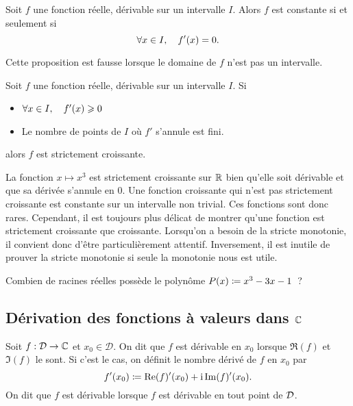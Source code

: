 \documentclass{magnoliaold}
\begin{document}
\begin{proposition}[utile=3]
Soit $f$ une fonction réelle, dérivable sur un intervalle $I$. Alors $f$ est
constante si et seulement si
\[\forall x\in I ,\quad f'(x)=0.\]
\end{proposition}

\begin{remarqueUnique}
\remarque Cette proposition est fausse lorsque le domaine de 
  $f$ n'est pas un intervalle. 
\end{remarqueUnique}

\begin{proposition}[utile=2]
Soit $f$ une fonction réelle, dérivable sur un intervalle $I$. Si
\begin{itemize}
\item $\forall x\in I ,\quad f'(x)\geqslant 0$
\item Le nombre de points de $I$ où $f'$ s'annule est fini.
\end{itemize}
alors $f$ est strictement croissante.
\end{proposition}

\begin{remarques}
\remarque La fonction $x\mapsto x^3$ est strictement croissante sur $\mathbb{R}$ bien
  qu'elle soit dérivable et que sa dérivée s'annule en 0.
\remarque Une fonction croissante qui n'est pas strictement croissante est constante sur un intervalle non trivial. Ces fonctions sont donc rares. Cependant, il est toujours plus délicat de montrer qu'une fonction est strictement croissante que croissante. Lorsqu'on a besoin de la stricte monotonie, il convient donc d'être particulièrement attentif. Inversement, il est inutile de prouver la stricte monotonie si seule la monotonie nous est utile.
\end{remarques}

\begin{exoUnique}
\exo Combien de racines réelles possède le polynôme $P(x)\coloneqq x^3-3x-1$~?
\end{exoUnique}


\subsection{Dérivation des fonctions à valeurs dans $\mathbb{C}$}

\begin{definition}[utile=-3]
Soit $f:\mathcal{D}\to\mathbb{C}$ et $x_0\in\mathcal{D}$. On dit que $f$ est dérivable en $x_0$ lorsque $\Re(f)$ et $\Im(f)$ le sont. Si c'est le cas, on définit le nombre dérivé de $f$ en $x_0$ par
\[f'(x_0)\coloneqq \mathop{\rm Re}(f)'(x_0)+{\rm i} \mathop{\rm Im}(f)'(x_0).\]
On dit que $f$ est dérivable lorsque $f$ est dérivable en tout point de $\mathcal{D}$.
\end{definition}
\end{document}
